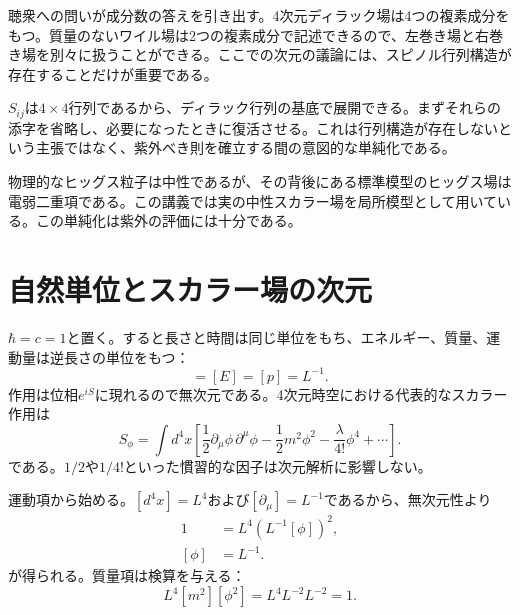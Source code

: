 聴衆への問いが成分数の答えを引き出す。4次元ディラック場は4つの複素成分をもつ。質量のないワイル場は2つの複素成分で記述できるので、左巻き場と右巻き場を別々に扱うことができる。ここでの次元の議論には、スピノル行列構造が存在することだけが重要である。

\(S_{ij}\)は\(4\times4\)行列であるから、ディラック行列の基底で展開できる。まずそれらの添字を省略し、必要になったときに復活させる。これは行列構造が存在しないという主張ではなく、紫外べき則を確立する間の意図的な単純化である。

\begin{classroomqa}
\end{classroomqa}

物理的なヒッグス粒子は中性であるが、その背後にある標準模型のヒッグス場は電弱二重項である。この講義では実の中性スカラー場を局所模型として用いている。この単純化は紫外の評価には十分である。

\section{自然単位とスカラー場の次元}

\(\hbar=c=1\)と置く。すると長さと時間は同じ単位をもち、エネルギー、質量、運動量は逆長さの単位をもつ：
\begin{equation}
[m]=[E]=[p]=L^{-1}.
\end{equation}
作用は位相\(e^{iS}\)に現れるので無次元である。4次元時空における代表的なスカラー作用は
\begin{equation}
S_\phi=\int d^4x\left[
\frac12\partial_\mu\phi\,\partial^\mu\phi
-\frac12m^2\phi^2
-\frac{\lambda}{4!}\phi^4
+\cdots\right].
\end{equation}
である。\(1/2\)や\(1/4!\)といった慣習的な因子は次元解析に影響しない。

運動項から始める。\([d^4x]=L^4\)および\([\partial_\mu]=L^{-1}\)であるから、無次元性より
\begin{align}
1
&=L^4\left(L^{-1}[\phi]\right)^2,\\
[\phi]&=L^{-1}.
\end{align}
が得られる。質量項は検算を与える：
\begin{equation}
L^4[m^2][\phi^2]
=L^4L^{-2}L^{-2}=1.
\end{equation}

